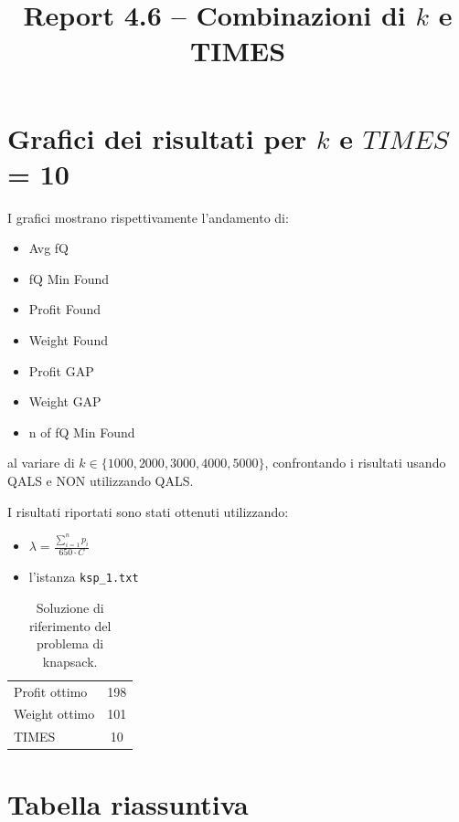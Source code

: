 \documentclass[a4paper,12pt]{article}
\title{Report 4.6 -- Combinazioni di $k$ e TIMES}
\begin{document}
\maketitle

\newpage

\section{Grafici dei risultati per $k$ e $TIMES$ = 10}

I grafici mostrano rispettivamente l'andamento di:
\begin{itemize}
    \item Avg fQ
    \item fQ Min Found
    \item Profit Found
    \item Weight Found
    \item Profit GAP
    \item Weight GAP
    \item n of fQ Min Found
\end{itemize}
al variare di $k \in \{1000, 2000, 3000, 4000, 5000\}$, confrontando
i risultati usando QALS e NON utilizzando QALS.

I risultati riportati sono stati ottenuti utilizzando:

\begin{itemize}
    \item $\lambda = \frac{\sum_{i=1}^{n} p_i}{650 \cdot C}$
    \item l'istanza \texttt{ksp\_1.txt}
\end{itemize}

\begin{table}[H]
\centering
\begin{tabular}{lc}
\toprule
Profit ottimo & 198 \\
Weight ottimo & 101 \\
TIMES & 10 \\
\bottomrule
\end{tabular}
\caption{Soluzione di riferimento del problema di knapsack.}
\end{table}

\section{Tabella riassuntiva}
\end{document}
